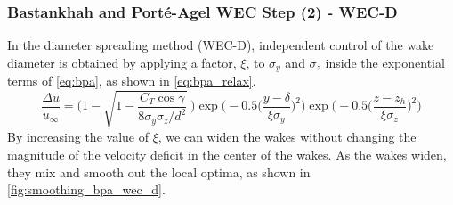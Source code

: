 \documentclass{jpconf}
\begin{document}
\subsubsection{Bastankhah and Port\'e-Agel WEC Step (2) - WEC-D}
In the diameter spreading method (WEC-D), independent control of the wake diameter is obtained by applying a factor, $\xi$, to $\sigma_y$ and $\sigma_z$ inside the exponential terms of \cref{eq:bpa}, as shown in \cref{eq:bpa_relax}.
\begin{equation}
	\frac{\Delta \bar{u}}{\bar{u}_{\infty}} = \Bigg(1-\sqrt{1-\frac{C_T \cos{\gamma}}{8 \sigma_y \sigma_z/d^2}}~\Bigg) \exp{\bigg(-0.5\Big(\frac{y-\delta}{\xi \sigma_y}\Big)^2\bigg)}\exp{\bigg(-0.5\Big(\frac{z-z_h}{\xi \sigma_z}\Big)^2\bigg)}
	\label{eq:bpa_relax}
\end{equation}
By increasing the value of $\xi$, we can widen the wakes without changing the magnitude of the velocity deficit in the center of the wakes. As the wakes widen, they mix and smooth out the local optima, as shown in \cref{fig:smoothing_bpa_wec_d}. 
%
\end{document}
